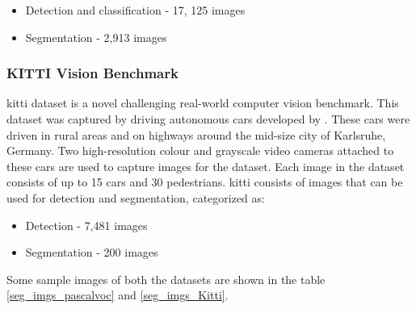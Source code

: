 \begin{itemize}

    \item Detection and classification - 17, 125 images
    \item Segmentation - 2,913 images 

\end{itemize}

\subsubsection{KITTI Vision Benchmark} \label{Kitti}

\ac{kitti} dataset is a novel challenging real-world computer vision benchmark. This dataset was captured by driving autonomous cars developed by \cite{AnnieWay}. These cars were driven in rural areas and on highways around the mid-size city of Karlsruhe, Germany. Two high-resolution colour and grayscale video cameras attached to these cars are used to capture images for the dataset. Each image in the dataset consists of up to 15 cars and 30 pedestrians. \ac{kitti} consists of images that can be used for detection and segmentation, categorized as:

\begin{itemize}
    \item Detection - 7,481 images
    \item Segmentation - 200 images
\end{itemize}

Some sample images of both the datasets are shown in the table \ref{seg_imgs_pascalvoc} and \ref{seg_imgs_Kitti}. 


